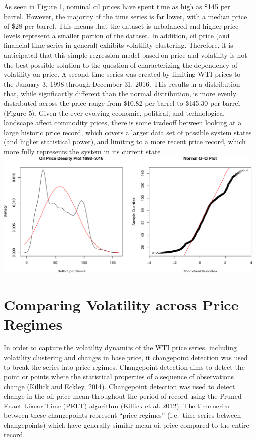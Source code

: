 \documentclass[11pt,]{article}
\begin{document}
As seen in Figure 1, nominal oil prices have spent time as high as \$145
per barrel. However, the majority of the time series is far lower, with
a median price of \$28 per barrel. This means that the dataset is
unbalanced and higher price levels represent a smaller portion of the
dataset. In addition, oil price (and financial time series in general)
exhibits volatility clustering. Therefore, it is anticipated that this
simple regression model based on price and volatility is not the best
possible solution to the question of characterizing the dependency of
volatility on price. A second time series was created by limiting WTI
prices to the January 3, 1998 through December 31, 2016. This results in
a distribution that, while signficantly different than the normal
distribution, is more evenly distributed across the price range from
\$10.82 per barrel to \$145.30 per barrel (Figure 5). Given the ever
evolving economic, political, and technological landscape affect
commodity prices, there is some tradeoff between looking at a large
historic price record, which covers a larger data set of possible system
states (and higher statistical power), and limiting to a more recent
price record, which more fully represents the system in its current
state.\\
\includegraphics{Figs/unnamed-chunk-10-1.pdf}

\section{Comparing Volatility across Price
Regimes}\label{comparing-volatility-across-price-regimes}

In order to capture the volatility dynamics of the WTI price series,
including volatility clustering and changes in base price, it
changepoint detection was used to break the series into price regimes.
Changepoint detection aims to detect the point or points where the
statistical properties of a sequence of observations change (Killick and
Eckley, 2014). Changepoint detection was used to detect change in the
oil price mean throughout the period of record using the Pruned Exact
Linear Time (PELT) algorithm (Killick et al. 2012). The time series
between these changepoints represent ``price regimes'' (i.e.~time series
between changepoints) which have generally similar mean oil price
compared to the entire record.
\end{document}
